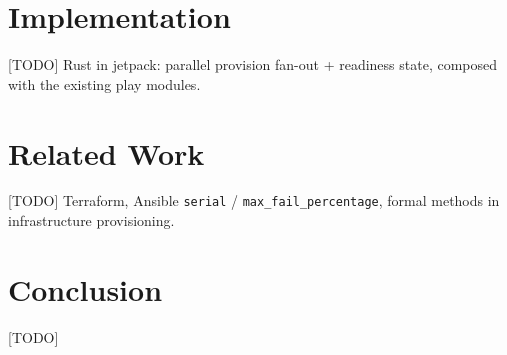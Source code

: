 \documentclass[11pt]{article}
\begin{document}
\section{Implementation}
[TODO] Rust in jetpack: parallel provision fan-out + readiness state, composed
with the existing play modules.

\section{Related Work}
[TODO] Terraform, Ansible \texttt{serial} / \texttt{max\_fail\_percentage}, formal
methods in infrastructure provisioning.

\section{Conclusion}
[TODO]
\end{document}
